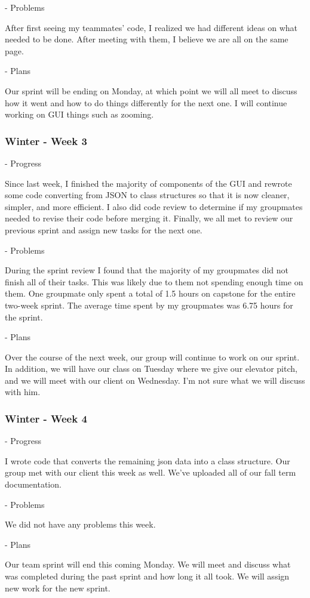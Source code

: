 \documentclass[onecolumn, draftclsnofoot,10pt, compsoc]{IEEEtran}
\begin{document}
- Problems

After first seeing my teammates' code, I realized we had different ideas on what needed to be done.
After meeting with them, I believe we are all on the same page.

- Plans

Our sprint will be ending on Monday, at which point we will all meet to discuss how it went and how to do things differently for the next one.
I will continue working on GUI things such as zooming.
\subsubsection{Winter - Week 3}
- Progress

Since last week, I finished the majority of components of the GUI and rewrote some code converting from JSON to class structures so that it is now cleaner, simpler, and more efficient.
I also did code review to determine if my groupmates needed to revise their code before merging it.
Finally, we all met to review our previous sprint and assign new tasks for the next one.

- Problems

During the sprint review I found that the majority of my groupmates did not finish all of their tasks.
This was likely due to them not spending enough time on them.
One groupmate only spent a total of 1.5 hours on capstone for the entire two-week sprint.
The average time spent by my groupmates was 6.75 hours for the sprint.

- Plans

Over the course of the next week, our group will continue to work on our sprint.
In addition, we will have our class on Tuesday where we give our elevator pitch, and we will meet with our client on Wednesday.
I'm not sure what we will discuss with him.
\subsubsection{Winter - Week 4}
- Progress

I wrote code that converts the remaining json data into a class structure.
Our group met with our client this week as well.
We've uploaded all of our fall term documentation.

- Problems

We did not have any problems this week.

- Plans

Our team sprint will end this coming Monday.
We will meet and discuss what was completed during the past sprint and how long it all took.
We will assign new work for the new sprint.
\end{document}

